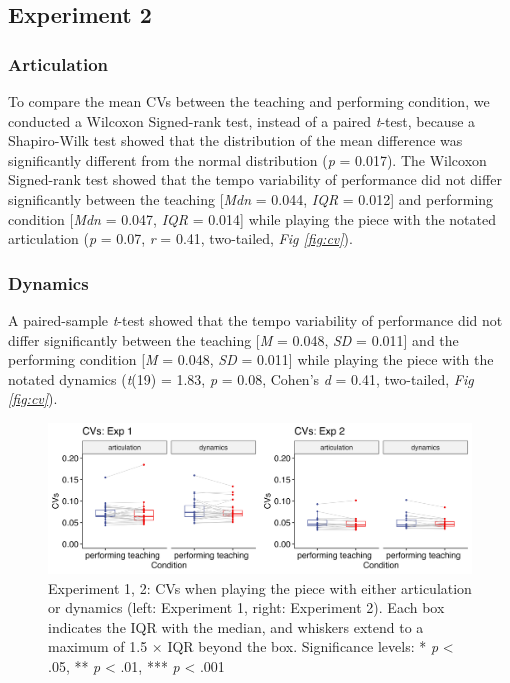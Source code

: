 \documentclass[
  man,floatsintext]{apa6}
\begin{document}
\hypertarget{experiment-2-3}{%
\subsection{Experiment 2}\label{experiment-2-3}}

\hypertarget{articulation-3}{%
\subsubsection{Articulation}\label{articulation-3}}

To compare the mean CVs between the teaching and performing condition, we conducted a Wilcoxon Signed-rank test, instead of a paired \emph{t}-test, because a Shapiro-Wilk test showed that the distribution of the mean difference was significantly different from the normal distribution (\emph{p} = 0.017). The Wilcoxon Signed-rank test showed that the tempo variability of performance did not differ significantly between the teaching {[}\emph{Mdn} = 0.044, \emph{IQR} = 0.012{]} and performing condition {[}\emph{Mdn} = 0.047, \emph{IQR} = 0.014{]} while playing the piece with the notated articulation (\emph{p} = 0.07, \emph{r} = 0.41, two-tailed, \emph{Fig \ref{fig:cv}}).

\hypertarget{dynamics-3}{%
\subsubsection{Dynamics}\label{dynamics-3}}

A paired-sample \emph{t}-test showed that the tempo variability of performance did not differ significantly between the teaching {[}\emph{M} = 0.048, \emph{SD} = 0.011{]} and the performing condition {[}\emph{M} = 0.048, \emph{SD} = 0.011{]} while playing the piece with the notated dynamics (\emph{t}(19) = 1.83, \emph{p} = 0.08, Cohen's \emph{d} = 0.41, two-tailed, \emph{Fig \ref{fig:cv}}).

\begin{figure}
\includegraphics[width=1\linewidth]{manuscript_files/figure-latex/plot-cv-1} \caption{\label{fig:cv}Experiment 1, 2: CVs when playing the piece with either articulation or dynamics (left: Experiment 1, right: Experiment 2). Each box indicates the IQR with the median, and whiskers extend to a maximum of 1.5 × IQR beyond the box. Significance levels: * \textit{p} < .05, ** \textit{p} < .01, *** \textit{p} < .001}\label{fig:plot-cv}
\end{figure}
\end{document}
